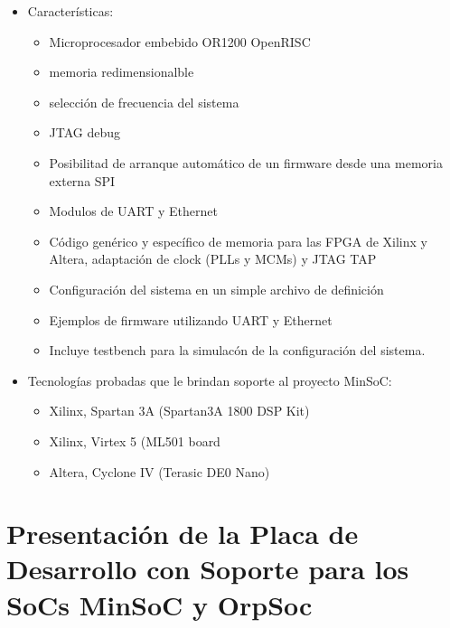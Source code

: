 \begin{itemize}
\item Características:
				\begin{itemize}
				  \item Microprocesador embebido OR1200 OpenRISC 
				  \item memoria redimensionalble
				  \item selección de frecuencia del sistema
				  \item JTAG debug 
				  \item Posibilitad de arranque automático de un firmware desde una memoria externa SPI
				  \item Modulos de UART y Ethernet 
				  \item Código genérico y específico de memoria para las FPGA de Xilinx y Altera, adaptación de clock (PLLs y MCMs) y JTAG TAP
				  \item Configuración del sistema en un simple archivo de definición 
				  \item Ejemplos de firmware utilizando UART y Ethernet  
				  \item Incluye testbench para la simulacón de la configuración del sistema. 						
				\end{itemize}

\item Tecnologías probadas que le brindan soporte al proyecto MinSoC:


\begin{itemize}
				  \item Xilinx, Spartan 3A (Spartan3A 1800 DSP Kit)
				  \item Xilinx, Virtex 5 (ML501 board
				  \item Altera, Cyclone IV (Terasic DE0 Nano) 
				\end{itemize}
\end{itemize}

				

\section{Presentación de la Placa de Desarrollo con Soporte para los SoCs MinSoC y OrpSoc} \label{sec:placas}
 

